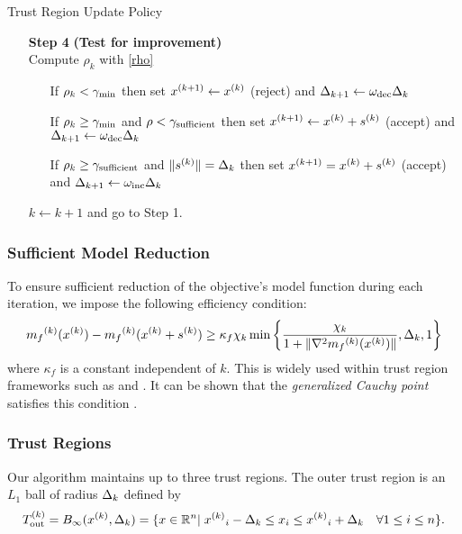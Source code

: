 \begin{algorithm}[H]
    \caption{Trust Region Update Policy}
    \label{trust_region_update}
    \begin{itemize}
        \item[\textbf{Step 4}] \textbf{(Test for improvement)} \\
            Compute $\rho_k$ with \cref{rho} \begin{itemize}
                \item[] If $\rho_k < \gamma_{\text{min}}$ then set ${{x}^{(k+1)}} \gets {x^{(k)}}$ (reject) and $\Delta_{k+1} \gets \omega_{\text{dec}}\Delta_{k}$
                \item[] If $\rho_k \ge \gamma_{\text{min}}$ and $\rho < \gamma_{\text{sufficient}}$ then set ${{x}^{(k+1)}}\gets{x^{(k)}}+{{s}^{(k)}}$ (accept) and $\Delta_{k+1} \gets \omega_{\text{dec}}\Delta_{k}$
                \item[] If $\rho_k \ge \gamma_{\text{sufficient}}$ and $\|{{s}^{(k)}}\| = \Delta_{k}$ then set ${{x}^{(k+1)}}={x^{(k)}}+{{s}^{(k)}}$ (accept) and $\Delta_{k+1} \gets \omega_{\text{inc}}\Delta_{k}$
            \end{itemize}
            $k \gets k+1$ and go to Step 1.
    \end{itemize}
\end{algorithm}

\subsubsection{Sufficient Model Reduction}

To ensure sufficient reduction of the objective's model function during each iteration, we impose the following efficiency condition:
\begin{equation}
\label{efficiency}
{{m}_f}^{(k)}({x^{(k)}}) - {{m}_f}^{(k)}({x^{(k)}} + {{s}^{(k)}}) \ge \kappa_f \chi_k \min\left\{ \frac{\chi_k}{1+\|\nabla^2 {{m}_f}^{(k)}({x^{(k)}})\|}, \Delta_k, 1 \right\}
\end{equation}
where $\kappa_f$ is a constant independent of $k$.
This is widely used within trust region frameworks such as \cite{Conejo:2013:GCT:2620806.2621814} and \cite{Conn:2000:TM:357813}.
It can be shown that the \emph{generalized Cauchy point} satisfies this condition \cite{Conn:2000:TM:357813}.


\subsubsection{Trust Regions}
Our algorithm maintains up to three trust regions.
The outer trust region is an $L_1$ ball of radius $ \Delta_k $ defined by
\begin{equation}
\label{trust_region}
{T_{\text{out}}^{(k)}} = B_{\infty}({x^{(k)}},\Delta_k) = \{x\in \mathbb R^n | \; {{x^{(k)}}}_i - \Delta_k \le x_i \le {{x^{(k)}}}_i + \Delta_k \quad \forall 1\le i \le n\}.
\end{equation}

